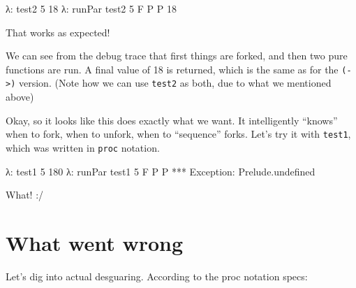 \documentclass[]{article}
\newenvironment{Shaded}{\begin{snugshade}}{\end{snugshade}}
\newcommand{\DataTypeTok}[1]{\textcolor[rgb]{0.13,0.29,0.53}{#1}}
\newcommand{\DecValTok}[1]{\textcolor[rgb]{0.00,0.00,0.81}{#1}}
\newcommand{\FunctionTok}[1]{\textcolor[rgb]{0.00,0.00,0.00}{#1}}
\newcommand{\NormalTok}[1]{#1}
\begin{document}
\begin{Shaded}
\begin{Highlighting}[]
\NormalTok{λ}\FunctionTok{:}\NormalTok{ test2 }\DecValTok{5}
\DecValTok{18}
\NormalTok{λ}\FunctionTok{:}\NormalTok{ runPar test2 }\DecValTok{5}
\DataTypeTok{F}
\DataTypeTok{P}
\DataTypeTok{P}
\DecValTok{18}
\end{Highlighting}
\end{Shaded}

That works as expected!

We can see from the debug trace that first things are forked, and then two pure
functions are run. A final value of 18 is returned, which is the same as for the
\texttt{(-\textgreater{})} version. (Note how we can use \texttt{test2} as both,
due to what we mentioned above)

Okay, so it looks like this does exactly what we want. It intelligently
``knows'' when to fork, when to unfork, when to ``sequence'' forks. Let's try it
with \texttt{test1}, which was written in \texttt{proc} notation.

\begin{Shaded}
\begin{Highlighting}[]
\NormalTok{λ}\FunctionTok{:}\NormalTok{ test1 }\DecValTok{5}
\DecValTok{180}
\NormalTok{λ}\FunctionTok{:}\NormalTok{ runPar test1 }\DecValTok{5}
\DataTypeTok{F}
\DataTypeTok{P}
\DataTypeTok{P}
\FunctionTok{***} \DataTypeTok{Exception}\FunctionTok{:}\NormalTok{ Prelude.undefined}
\end{Highlighting}
\end{Shaded}

What! :/

\hypertarget{what-went-wrong}{%
\section{What went wrong}\label{what-went-wrong}}

Let's dig into actual desguaring. According to the proc notation specs:
\end{document}
